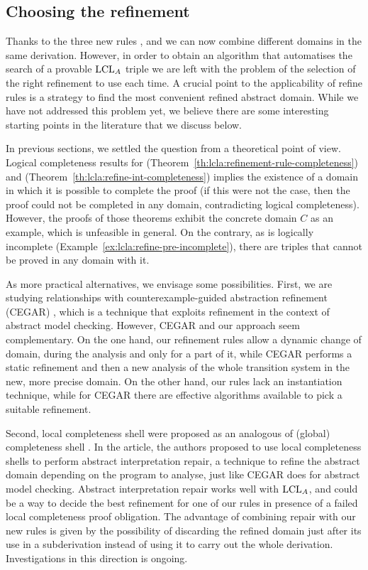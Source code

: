 \subsection{Choosing the refinement}\label{sec:lcla:choose-refinement}
Thanks to the three new rules ,  and  we can now combine different domains in the same derivation.
However, in order to obtain an algorithm that automatises the search of a provable $\text{LCL}_A$ triple we are left with the problem of the selection of the right refinement to use each time. A crucial point to the applicability of refine rules is a strategy to find the most convenient refined abstract domain. While we have not addressed this problem yet, we believe there are some interesting starting points in the literature that we discuss below.

In previous sections, we settled the question from a theoretical point of view. Logical completeness results for  (Theorem~\ref{th:lcla:refinement-rule-completeness}) and  (Theorem~\ref{th:lcla:refine-int-completeness}) implies the existence of a domain in which it is possible to complete the proof (if this were not the case, then the proof could not be completed in any domain, contradicting logical completeness). However, the proofs of those theorems exhibit the concrete domain $C$ as an example, which is unfeasible in general. On the contrary, as  is logically incomplete (Example~\ref{ex:lcla:refine-pre-incomplete}), there are triples that cannot be proved in any domain with it.

As more practical alternatives, we envisage some possibilities.
First, we are studying relationships with counterexample\hyp{}guided abstraction refinement (CEGAR) \cite{CGJLV00}, which is a technique that exploits refinement in the context of abstract model checking. However, CEGAR and our approach seem complementary. On the one hand, our refinement rules allow a dynamic change of domain, during the analysis and only for a part of it, while CEGAR performs a static refinement and then a new analysis of the whole transition system in the new, more precise domain. On the other hand, our rules lack an instantiation technique, while for CEGAR there are effective algorithms available to pick a suitable refinement.

Second, local completeness shell \cite{BGGR22} were proposed as an analogous of (global) completeness shell \cite{GRS00}. In the article, the authors proposed to use local completeness shells to perform abstract interpretation repair, a technique to refine the abstract domain depending on the program to analyse, just like CEGAR does for abstract model checking. Abstract interpretation repair works well with $\text{LCL}_A$, and could be a way to decide the best refinement for one of our rules in presence of a failed local completeness proof obligation. The advantage of combining repair with our new rules is given by the possibility of discarding the refined domain just after its use in a subderivation instead of using it to carry out the whole derivation. Investigations in this direction is ongoing.

